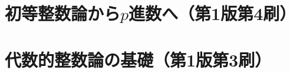 \documentclass[a4paper]{ltjsreport}
\begin{document}
\part{初等整数論から$p$進数へ（第1版第4刷）}

\part{代数的整数論の基礎（第1版第3刷）}




\end{document}
